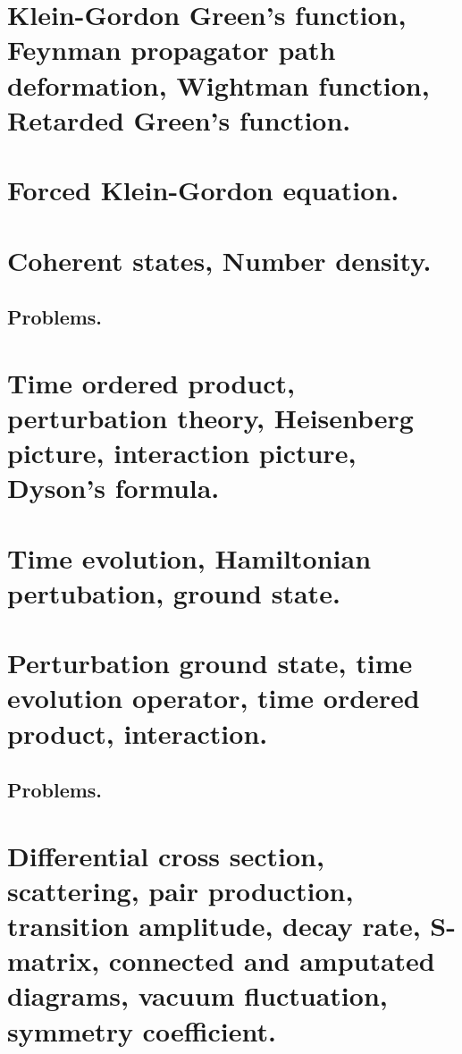    \chapter{Klein-Gordon Green's function, Feynman propagator path deformation, Wightman function, Retarded Green's function.}
      
   \chapter{Forced Klein-Gordon equation.}
      
   \chapter{Coherent states, Number density.}
      
      \section{Problems.}
         
   \chapter{Time ordered product, perturbation theory, Heisenberg picture, interaction picture, Dyson's formula.}
      
      
   \chapter{Time evolution, Hamiltonian pertubation, ground state.}
      
   \chapter{Perturbation ground state, time evolution operator, time ordered product, interaction.}
      
      
      \section{Problems.}
         
         
   \chapter{Differential cross section, scattering, pair production, transition amplitude, decay rate, S-matrix, connected and amputated diagrams, vacuum fluctuation, symmetry coefficient.}
      
